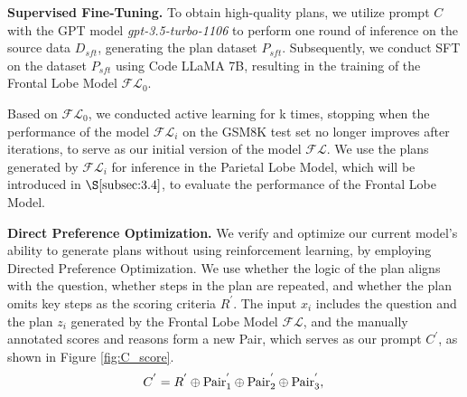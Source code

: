 \documentclass[11pt]{article}
\begin{document}

\textbf{Supervised Fine-Tuning.} To obtain high-quality plans, we utilize prompt $C$ with the GPT model \textit{gpt-3.5-turbo-1106} to perform one round of inference on the source data $D_{sft}$, generating the plan dataset $P_{sft}$. Subsequently, we conduct SFT on the dataset $P_{sft}$ using Code LLaMA 7B, resulting in the training of the Frontal Lobe Model $\mathcal{FL}_0$.


Based on $\mathcal{FL}_0$, we conducted active learning for k times, stopping when the performance of the model $\mathcal{FL}_i$ on the GSM8K test set no longer improves after iterations, to serve as our initial version of the model $\mathcal{FL}$. We use the plans generated by $\mathcal{FL}_i$ for inference in the Parietal Lobe Model, which will be introduced in $\S \ref{subsec:3.4}$, to evaluate the performance of the Frontal Lobe Model.


\textbf{Direct Preference Optimization.} We verify and optimize our current model's ability to generate plans without using reinforcement learning, by employing Directed Preference Optimization. We use whether the logic of the plan aligns with the question, whether steps in the plan are repeated, and whether the plan omits key steps as the scoring criteria $R^{'}$. The input $x_i$ includes the question and the plan $z_i$ generated by the Frontal Lobe Model $\mathcal{FL}$, and the manually annotated scores and reasons form a new Pair, which serves as our prompt $C^{'}$, as shown in Figure \ref{fig:C_score}. 
\begin{equation}
    C^{'} = R^{'} \oplus \mathrm{Pair}^{'}_1 \oplus \mathrm{Pair}^{'}_2 \oplus \mathrm{Pair}^{'}_3, \\
\end{equation}
\end{document}

